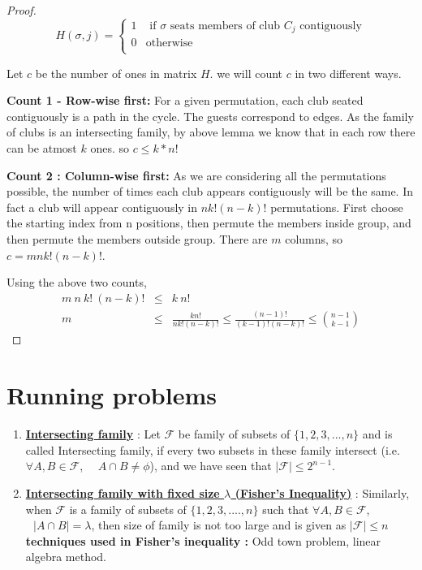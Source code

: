 \begin{theorem}
\begin{proof}
$$H(\sigma,j) = 
\begin{cases}
1 & \textrm{~if $\sigma$ seats members of club $C_j$ contiguously} \\
0 & \textrm{otherwise} \\
\end{cases}
$$

Let $c$ be the number of ones in matrix $H$. we will count $c$ in two different ways.

\begin{description}
\item{\textbf{Count 1 - Row-wise first:}} For a given permutation, each club seated contiguously is a path in the cycle. The guests correspond to edges. As the family of clubs is an intersecting family, by above lemma we know that in each row there can be atmost $k$ ones. so $c \le k*n!$
\item{\textbf{Count 2 : Column-wise first:}} As we are considering all the permutations possible, the number of times each club appears contiguously will be the same. In fact a club will appear contiguously in $nk!(n-k)!$ permutations. First choose the starting index from n positions, then permute the members inside group, and then permute the members outside group. There are $m$ columns, so $c=mnk!(n-k)!$.
\end{description}
Using the above two counts, 
\begin{eqnarray*}
m~n~k!~(n-k)! & \le & k~n! \\ 
m & \le & \frac{kn!}{nk!(n-k)!} \le \frac{(n-1)!}{(k-1)!(n-k)!} \le {n-1 \choose k-1}
\end{eqnarray*}


\end{proof}
\end{theorem}


\section {Running problems}

\begin{enumerate}
    \item \underline{\textbf{Intersecting family}} : Let $\mathcal{F}$ be family of subsets of $\{1,2,3,...,n\}$ and is called Intersecting family, if every two subsets in these family intersect (i.e. $\forall A, B \in \mathcal{F}$, ~~$A \cap B \ne \phi$), and we have seen that $|\mathcal{F}|\le 2^{n-1}$.
    
    \item \underline{\textbf{Intersecting family with fixed size $\lambda$ (Fisher's Inequality)}} : Similarly, when $\mathcal{F}$ is a family of subsets of $\{1,2,3,....,n\}$ such that $\forall A, B \in \mathcal{F}$, $~~~|A\cap B| = \lambda$, then size of family is not too large and is given as $|\mathcal{F}|\le n$
    \subitem \textbf{techniques used in Fisher's inequality :} Odd town problem, linear algebra method. 
\end{enumerate}

